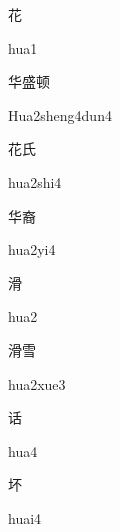 \begin{verbete}[hua1]{花}
\begin{pronuncia}{hua1}
\end{pronuncia}
\end{verbete}

\begin{verbete}{华盛顿}
\begin{pronuncia}{Hua2sheng4dun4}
\end{pronuncia}
\end{verbete}

\begin{verbete}{花氏}
\begin{pronuncia}{hua2shi4}
\end{pronuncia}
\end{verbete}

\begin{verbete}[hua2yi4]{华裔}
\begin{pronuncia}{hua2yi4}
\end{pronuncia}
\end{verbete}

\begin{verbete}[hua2]{滑}
\begin{pronuncia}{hua2}
\end{pronuncia}
\end{verbete}

\begin{verbete}{滑雪}
\begin{pronuncia}{hua2xue3}
\end{pronuncia}
\end{verbete}

\begin{verbete}[hua4]{话}
\begin{pronuncia}{hua4}
\end{pronuncia}
\end{verbete}

\begin{verbete}[huai4]{坏}
\begin{pronuncia}{huai4}
\end{pronuncia}
\end{verbete}

